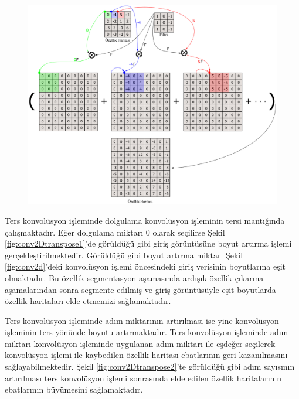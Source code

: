\begin{figure}[h!]
	\begin{center}
		\vspace{0.4cm}
		{
			\vspace{0.4cm}
			\includegraphics[scale=0.2]{Yapilan-Calismalar/Figures/conv2Dtranspose2.pdf}
		}
	\end{center}
\end{figure}

Ters konvolüsyon işleminde dolgulama konvolüsyon işleminin tersi mantığında çalışmaktadır. Eğer dolgulama miktarı $0$ olarak seçilirse Şekil \ref{fig:conv2Dtranspose1}'de görüldüğü gibi giriş görüntüsüne boyut artırma işlemi gerçekleştirilmektedir. Görüldüğü gibi boyut artırma miktarı Şekil \ref{fig:conv2d}'deki konvolüsyon işlemi öncesindeki giriş verisinin boyutlarına eşit olmaktadır. Bu özellik segmentasyon aşamasında ardışık özellik çıkarma aşamalarından sonra segmente edilmiş ve giriş görüntüsüyle eşit boyutlarda özellik haritaları elde etmemizi sağlamaktadır.

Ters konvolüsyon işleminde adım miktarının artırılması ise yine konvolüsyon işleminin ters yönünde boyutu artırmaktadır. Ters konvolüsyon işleminde adım miktarı konvolüsyon işleminde uygulanan adım miktarı ile eşdeğer seçilerek konvolüsyon işlemi ile kaybedilen özellik haritası ebatlarının geri kazanılmasını sağlayabilmektedir. Şekil \ref{fig:conv2Dtranspose2}'te görüldüğü gibi adım sayısının artırılması ters konvolüsyon işlemi sonrasında elde edilen özellik haritalarının ebatlarının büyümesini sağlamaktadır.

